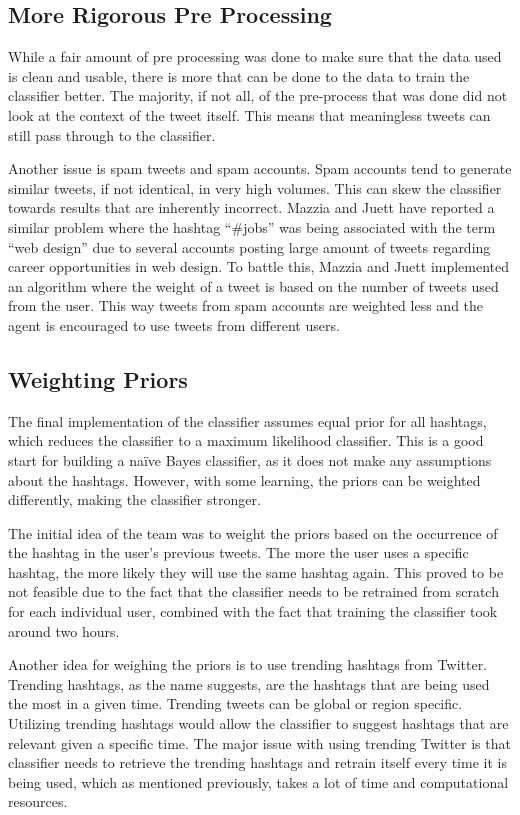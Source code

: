 \documentclass[conference]{IEEEtran}
\begin{document}
\subsection{More Rigorous Pre Processing}
While a fair amount of pre processing was done to make sure that the data used is clean and usable, there is more that can be done to the data to train the classifier better. The majority, if not all, of the pre-process that was done did not look at the context of the tweet itself. This means that meaningless tweets can still pass through to the classifier.

Another issue is spam tweets and spam accounts. Spam accounts tend to generate similar tweets, if not identical, in very high volumes. This can skew the classifier towards results that are inherently incorrect. Mazzia and Juett have reported a similar problem where the hashtag ``\#jobs'' was being associated with the term “web design” due to several accounts posting large amount of tweets regarding career opportunities in web design. To battle this, Mazzia and Juett implemented an algorithm where the weight of a tweet is based on the number of tweets used from the user. This way tweets from spam accounts are weighted less and the agent is encouraged to use tweets from different users.
\subsection{Weighting Priors}
The final implementation of the classifier assumes equal prior for all hashtags, which reduces the classifier to a maximum likelihood classifier. This is a good start for building a naïve Bayes classifier, as it does not make any assumptions about the hashtags. However, with some learning, the priors can be weighted differently, making the classifier stronger.

The initial idea of the team was to weight the priors based on the occurrence of the hashtag in the user’s previous tweets. The more the user uses a specific hashtag, the more likely they will use the same hashtag again. This proved to be not feasible due to the fact that the classifier needs to be retrained from scratch for each individual user, combined with the fact that training the classifier took around two hours.

Another idea for weighing the priors is to use trending hashtags from Twitter. Trending hashtags, as the name suggests, are the hashtags that are being used the most in a given time. Trending tweets can be global or region specific. Utilizing trending hashtags would allow the classifier to suggest hashtags that are relevant given a specific time. The major issue with using trending Twitter is that classifier needs to retrieve the trending hashtags and retrain itself every time it is being used, which as mentioned previously, takes a lot of time and computational resources.
\end{document}
